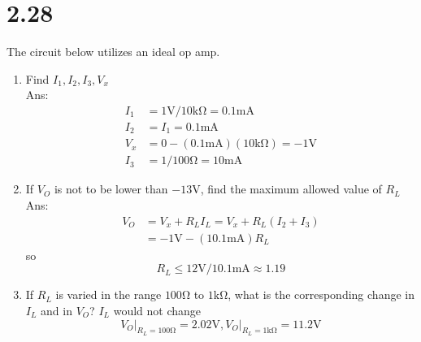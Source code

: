 \documentclass[12pt, a4paper]{article}
\newcommand{\smia}{\si{\milli\ampere}}
\newcommand{\svol}{\si{\volt}}
\newcommand{\sohm}{\si{\ohm}}
\newcommand{\skom}{\si{\kilo\ohm}}
\begin{document}
\section{2.28}
The circuit below utilizes an ideal op amp.\\
\begin{figure}[H]
\centering
{}
\end{figure}
\begin{enumerate}[label=(\alph*)]
  \item Find $I_1, I_2, I_3, V_x$\\
    Ans: 
    \begin{align*}
      I_1 &= 1\si{\volt} / 10\si{\kilo\ohm} = 0.1\si{\milli\ampere}\\
      I_2 &= I_1 = 0.1\si{\milli\ampere}\\
      V_x &= 0 - (0.1\si{\milli\ampere})(10\si{\kilo\ohm}) = -1 \si{\volt}\\
      I_3 &= 1 / 100\si{\ohm} = 10\si{\milli\ampere}
    \end{align*}
  \item If $V_O$ is not to be lower than $-13\si{\volt}$, find the maximum allowed value of $R_L$\\
    Ans: 
    \begin{align*}
      V_O &= V_x + R_L I_L = V_x + R_L (I_2 + I_3)\\
          &= - 1\si{\volt} - (10.1 \smia) R_L
    \end{align*}
    so
    \[
      R_L \leq 12\svol / 10.1 \smia \approx 1.19
    \]
  \item If $R_L$ is varied in the range $100 \sohm$ to $1 \si{\kilo\ohm}$, what is the corresponding change in $I_L$ and in $V_O$?
    $I_L$ would not change\\
    \[
      V_O \rvert_{R_L = 100 \sohm} = 2.02 \svol, V_O \rvert_{R_L = 1\skom} = 11.2\svol
    \]
\end{enumerate}
\end{document}

